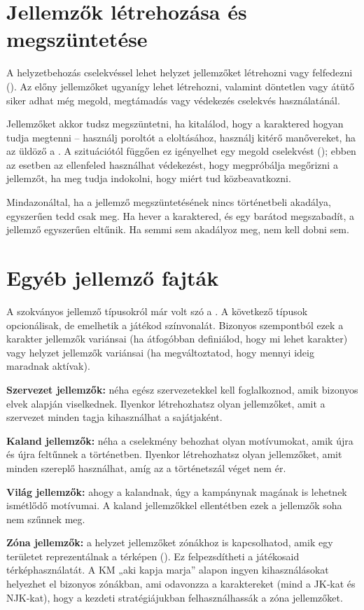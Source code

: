 \section{Jellemzők létrehozása és megszüntetése}

A helyzetbehozás cselekvéssel lehet helyzet jellemzőket létrehozni vagy felfedezni (). Az előny jellemzőket ugyanígy lehet létrehozni, valamint döntetlen vagy átütő siker adhat még megold, megtámadás vagy védekezés cselekvés használatánál.

Jellemzőket akkor tudsz megszüntetni, ha kitalálod, hogy a karaktered hogyan tudja megtenni – használj poroltót a  eloltásához, használj kitérő manővereket, ha az üldöző a . A szituációtól függően ez igényelhet egy megold cselekvést (); ebben az esetben az ellenfeled használhat védekezést, hogy megpróbálja megőrizni a jellemzőt, ha meg tudja indokolni, hogy miért tud közbeavatkozni.

Mindazonáltal, ha a jellemző megszüntetésének nincs történetbeli akadálya, egyszerűen tedd csak meg. Ha  hever a karaktered, és egy barátod megszabadít, a jellemző egyszerűen eltűnik. Ha semmi sem akadályoz meg, nem kell dobni sem.

\section{Egyéb jellemző fajták}

A szokványos jellemző típusokról már volt szó a . A következő típusok opcionálisak, de emelhetik a játékod színvonalát. Bizonyos szempontból ezek a karakter jellemzők variánsai (ha átfogóbban definiálod, hogy mi lehet karakter) vagy helyzet jellemzők variánsai (ha megváltoztatod, hogy mennyi ideig maradnak aktívak).

\textbf{Szervezet jellemzők:} néha egész szervezetekkel kell foglalkoznod, amik bizonyos elvek alapján viselkednek. Ilyenkor létrehozhatsz olyan jellemzőket, amit a szervezet minden tagja kihasználhat a sajátjaként.

\textbf{Kaland jellemzők:} néha a cselekmény behozhat olyan motívumokat, amik újra és újra feltűnnek a történetben. Ilyenkor létrehozhatsz olyan jellemzőket, amit minden szereplő használhat, amíg az a történetszál véget nem ér.

\textbf{Világ jellemzők:} ahogy a kalandnak, úgy a kampánynak magának is lehetnek ismétlődő motívumai. A kaland jellemzőkkel ellentétben ezek a jellemzők soha nem szűnnek meg.

\textbf{Zóna jellemzők:} a helyzet jellemzőket zónákhoz is kapcsolhatod, amik egy területet reprezentálnak a térképen (). Ez felpezsdítheti a játékosaid térképhasználatát. A KM „aki kapja marja” alapon ingyen kihasználásokat helyezhet el bizonyos zónákban, ami odavonzza a karaktereket (mind a JK‑kat és NJK‑kat), hogy a kezdeti stratégiájukban felhasználhassák a zóna jellemzőket.
